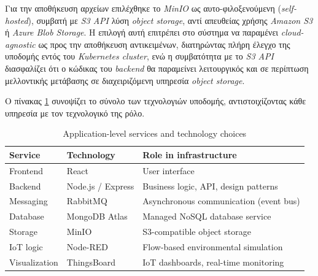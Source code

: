 Για την αποθήκευση αρχείων επιλέχθηκε το \textit{MinIO} ως αυτο-φιλοξενούμενη (\textit{self-hosted}), συμβατή με \textit{S3 API} λύση \textit{object storage}, αντί απευθείας χρήσης \textit{Amazon S3} ή \textit{Azure Blob Storage}. Η επιλογή αυτή επιτρέπει στο σύστημα να παραμένει \textit{cloud-agnostic} ως προς την αποθήκευση αντικειμένων, διατηρώντας πλήρη έλεγχο της υποδομής εντός του \textit{Kubernetes cluster}, ενώ η συμβατότητα με το \textit{S3 API} διασφαλίζει ότι ο κώδικας του \textit{backend} θα παραμείνει λειτουργικός και σε περίπτωση μελλοντικής μετάβασης σε διαχειριζόμενη υπηρεσία \textit{object storage}.

Ο πίνακας \ref{tab:infra} συνοψίζει το σύνολο των τεχνολογιών υποδομής, αντιστοιχίζοντας κάθε υπηρεσία με τον τεχνολογικό της ρόλο.

\begin{table}[htbp]
\centering
\renewcommand{\arraystretch}{1.5}
\caption{Application-level services and technology choices}
\label{tab:infra}
\small
\begin{tabularx}{\textwidth}{| >{\centering\arraybackslash}p{2.5cm} | >{\centering\arraybackslash}p{3cm} | X |}
\hline
\rowcolor{HUAblue} 
\textbf{\color{white} Service} & \textbf{\color{white} Technology} & \textbf{\color{white} Role in infrastructure} \\ \hline

Frontend & React & User interface \\ \hline

\rowcolor{lightgray!30}
Backend & Node.js / Express & Business logic, API, design patterns \\ \hline

Messaging & RabbitMQ & Asynchronous communication (event bus) \\ \hline

\rowcolor{lightgray!30}
Database & MongoDB Atlas & Managed NoSQL database service \\ \hline

Storage & MinIO & S3-compatible object storage \\ \hline

\rowcolor{lightgray!30}
IoT logic & Node-RED & Flow-based environmental simulation \\ \hline

Visualization & ThingsBoard & IoT dashboards, real-time monitoring \\ \hline
\end{tabularx}
\end{table}


